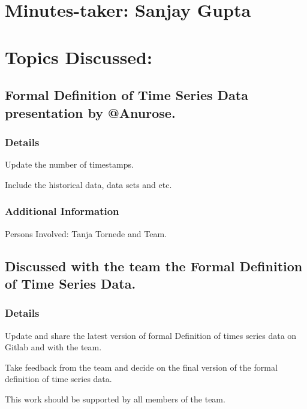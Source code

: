 \documentclass[11pt]{meetingmins} %
\begin{document}
\maketitle

\section{Minutes-taker: Sanjay Gupta}

\section{Topics Discussed:}

\subsection{Formal Definition of Time Series Data presentation by @Anurose.}
    \subsubsection{Details}
        \begin{hiddensubitems}
            \item
                Update the number of timestamps.
            \item
                Include the historical data, data sets and etc. 
        \end{hiddensubitems}
        
    \subsubsection{Additional Information}
        \begin{hiddensubitems}                   
            \item
                Persons Involved: Tanja Tornede and Team.
        \end{hiddensubitems}

\subsection{Discussed with the team the Formal Definition of Time Series Data.}
    \subsubsection{Details}
        \begin{hiddensubitems}
            \item
                Update and share the latest version of formal Definition of times series data on Gitlab and with the team.
            \item
                Take feedback from the team and decide on the final version of the formal definition of time series data.
            \item
                This work should be supported by all members of the team.
        \end{hiddensubitems}
        
\end{document}
